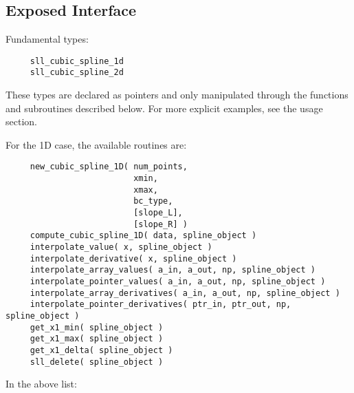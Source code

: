 \documentclass[]{report}   %
\begin{document}
\subsection{Exposed Interface}
Fundamental types:
\begin{verbatim}
     sll_cubic_spline_1d
     sll_cubic_spline_2d
\end{verbatim}
These types are declared as pointers and only manipulated through the functions and subroutines described below. For more explicit examples, see the usage section.

For the 1D case, the available routines are:
\begin{verbatim}
     new_cubic_spline_1D( num_points, 
                          xmin, 
                          xmax, 
                          bc_type, 
                          [slope_L], 
                          [slope_R] )  
     compute_cubic_spline_1D( data, spline_object )
     interpolate_value( x, spline_object )
     interpolate_derivative( x, spline_object )
     interpolate_array_values( a_in, a_out, np, spline_object )
     interpolate_pointer_values( a_in, a_out, np, spline_object )
     interpolate_array_derivatives( a_in, a_out, np, spline_object )
     interpolate_pointer_derivatives( ptr_in, ptr_out, np, spline_object )
     get_x1_min( spline_object )
     get_x1_max( spline_object )
     get_x1_delta( spline_object )
     sll_delete( spline_object )
\end{verbatim}
 
In the above list:
 
\end{document}
